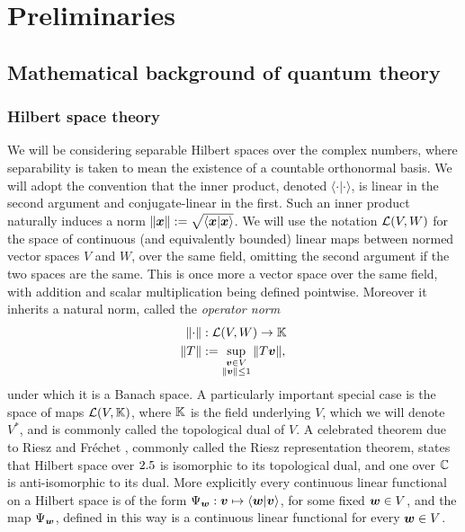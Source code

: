 \let\textcircled=\pgftextcircled
\chapter{Preliminaries}
\label{chap:prelim}


\bigskip

\section{Mathematical background of quantum theory}

\subsection{Hilbert space theory}

We will be considering separable Hilbert spaces over the complex numbers, where separability is taken to mean the existence of a countable orthonormal basis. We will adopt the convention that the inner product, denoted $\langle\cdot|\cdot\rangle$, is linear in the second argument and conjugate-linear in the first. Such an inner product naturally induces a norm ${\left\lVert{\bm{x}}\right\rVert} := \sqrt{\langle \bm{x}| \bm{x}\rangle}$. We will use the notation $\bops[V][W]$ for the space of continuous (and equivalently bounded) linear maps between normed vector spaces $V$ and $W$, over the same field, omitting the second argument if the two spaces are the same. This is once more a vector space over the same field, with addition and scalar multiplication being defined pointwise. Moreover it inherits a natural norm, called the \emph{operator norm} 
\begin{align}
  \norm{\cdot}&:\bops[V][W]\to \K\\
  \norm{T} &\defeq \sup_{\substack{\bov\in V \\ \norm{\bov}\leq 1}}\norm{T\bov}, \label{eqn:operator-norm}
\end{align}
under which it is a Banach space. A particularly important special case is the space of maps $\bops[V][\K]$, where $\mathbb{K}$ is the field underlying $V$, which we will denote $V^*$, and is commonly called the topological dual of $V$. A celebrated theorem due to Riesz \cite{riesz-representation-riesz} and Fr{\'e}chet \cite{riesz-representation-frechet}, commonly called the Riesz representation theorem, states that Hilbert space over $2.5$ is isomorphic to its topological dual, and one over $\mathbb{C}$ is anti-isomorphic to its dual. More explicitly every continuous linear functional on a Hilbert space is of the form $\Psi_{\bm{w}} :\bm{v}\mapsto \langle{\bm{w}} |\bm{v}\rangle$, for some fixed $\bm{w}\in V$, and the map $\Psi_{\bm{w}}$, defined in this way is a continuous linear functional for every $\bm{w}\in V$.

